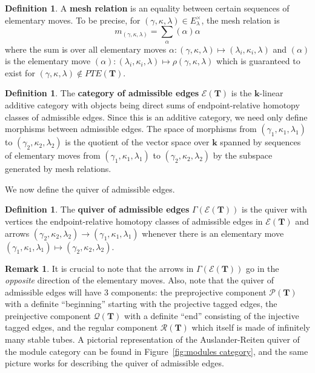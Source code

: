 \documentclass[11pt]{amsart}
\theoremstyle{plain}
\theoremstyle{definition}
\newtheorem{definition}[theorem]{Definition}
\newtheorem{remark}[theorem]{Remark}
\numberwithin{equation}{section}
\def\TT{\mathbf{T}}
\renewcommand{\k}{\mathbf{k}}
\begin{document}
\begin{definition}
    A \textbf{mesh relation} is an equality between certain sequences of elementary moves.
    To be precise, for $(\gamma, \kappa,\lambda) \in E^\times_\lambda$, the mesh relation is \[m_{(\gamma,\kappa,\lambda)} = \sum_\alpha (\alpha)\alpha\]
    where the sum is over all elementary moves $\alpha: (\gamma,\kappa,\lambda) \mapsto (\lambda_i, \kappa_i,\lambda)$ and $(\alpha)$ is the elementary move $(\alpha): (\lambda_i, \kappa_i,\lambda) \mapsto \rho(\gamma,\kappa,\lambda)$ which is guaranteed to exist for $(\gamma, \kappa,\lambda) \notin PTE(\TT)$.
\end{definition}
\begin{definition}
    The \textbf{category of admissible edges} $\mathcal{E(\TT)}$ is the $\k$-linear additive category with objects being direct sums of endpoint-relative homotopy classes of admissible edges.
    Since this is an additive category, we need only define morphisms between admissible edges.
    The space of morphisms from $(\gamma_1, \kappa_1, \lambda_1)$ to $(\gamma_2, \kappa_2, \lambda_2)$ is the quotient of the vector space over $\k$ spanned by sequences of elementary moves from $(\gamma_1, \kappa_1, \lambda_1) $ to $ (\gamma_2, \kappa_2, \lambda_2)$ by the subspace generated by mesh relations.
\end{definition}

We now define the quiver of admissible edges. 

\begin{definition}
    The \textbf{quiver of admissible edges} $\Gamma(\mathcal{E(\TT)})$ is the quiver with vertices the endpoint-relative homotopy classes of admissible edges in $\mathcal{E(\TT)}$ and arrows $(\gamma_2, \kappa_2, \lambda_2) \to (\gamma_1, \kappa_1, \lambda_1)$ whenever there is an elementary move $(\gamma_1, \kappa_1, \lambda_1) \mapsto (\gamma_2, \kappa_2, \lambda_2)$.
\end{definition}

\begin{remark}
    It is crucial to note that the arrows in $\Gamma(\mathcal{E(\TT)})$ go in the \textit{opposite} direction of the elementary moves.
    Also, note that the quiver of admissible edges will have 3 components: the preprojective component $\mathcal{P(\TT)}$ with a definite ``beginning'' starting with the projective tagged edges, the preinjective component $\mathcal{Q(\TT)}$ with a definite ``end'' consisting of the injective tagged edges, and the regular component $\mathcal{R(\TT)}$ which itself is made of infinitely many stable tubes.
    A pictorial representation of the Auslander-Reiten quiver of the module category can be found in Figure~\ref{fig:modules category}, and the same picture works for describing the quiver of admissible edges.
\end{remark}
\end{document}
